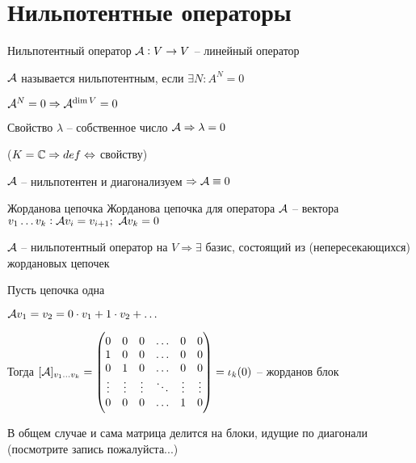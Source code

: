 \documentclass[12pt]{article}
\begin{document}
\section{Нильпотентные операторы}

\begin{defin}{Нильпотентный оператор}
    $\mathcal{A} : V \to V$ -- линейный оператор

    $\mathcal{A}$ называется нильпотентным, если $\exists N : A^N = 0$
\end{defin}

\begin{Remark}{}
    $\mathcal{A}^N = 0 \Rightarrow \mathcal{A}^{\dim V} = 0$
\end{Remark}

\begin{theo}{Свойство}
    $\lambda$ -- собственное число $\mathcal{A} \Rightarrow \lambda = 0$

    ($K = \mathbb C \Rightarrow def \Leftrightarrow$ свойству)
\end{theo}

\begin{Remark}{}
    $\mathcal{A}$ -- нильпотентен и диагонализуем $\Rightarrow \mathcal{A} \equiv 0$
\end{Remark}

\begin{defin}{Жорданова цепочка}
    Жорданова цепочка для оператора $\mathcal{A}$ -- вектора $v_1 \ldots v_k : \mathcal{A} v_i = v_{i + 1};\ \mathcal{A} v_k = 0$
\end{defin}

\begin{theo}{}
    $\mathcal{A}$ -- нильпотентный оператор на $V \Rightarrow \exists$ базис, состоящий из (непересекающихся) жордановых цепочек
\end{theo}

Пусть цепочка одна

$\mathcal{A} v_1 = v_2 = 0 \cdot v_1 + 1 \cdot v_2 + \ldots$

Тогда $[\mathcal{A}]_{v_1 \ldots v_k} = \begin{pmatrix}
    0 & 0 & 0 & \ldots & 0 & 0 \\
    1 & 0 & 0 & \ldots & 0 & 0 \\
    0 & 1 & 0 & \ldots & 0 & 0 \\
    \vdots & \vdots & \vdots & \ddots & \vdots & \vdots \\
    0 & 0 & 0 & \ldots & 1 & 0
\end{pmatrix} = \iota_k(0)$ -- жорданов блок

В общем случае и сама матрица делится на блоки, идущие по диагонали (посмотрите запись пожалуйста...)
\end{document}
